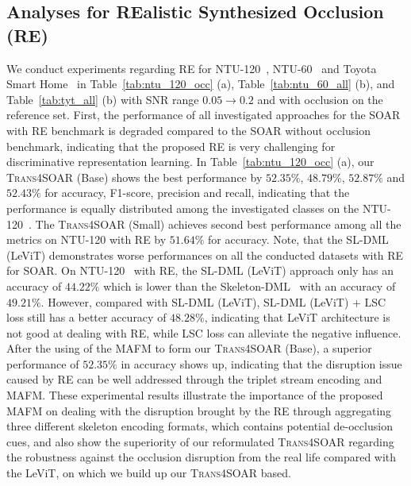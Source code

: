 \documentclass[lettersize,journal]{IEEEtran}
\begin{document}
\subsection{Analyses for REalistic Synthesized Occlusion (RE)}
We conduct experiments regarding RE for NTU-120~\cite{liu2019ntu}, NTU-60~\cite{shahroudy2016ntu} and Toyota Smart Home~\cite{Das_2019_ICCV} in Table~\ref{tab:ntu_120_occ} (a), Table~\ref{tab:ntu_60_all} (b), and Table~\ref{tab:tyt_all} (b) with SNR range $0.05\rightarrow0.2$ and with occlusion on the reference set.
First, the performance of all investigated approaches for the SOAR with RE benchmark is degraded compared to the SOAR without occlusion benchmark, indicating that the proposed RE is very challenging for discriminative representation learning.
In Table~\ref{tab:ntu_120_occ} (a), our \textsc{Trans4SOAR} (Base) shows the best performance by $52.35\%$, $48.79\%$, $52.87\%$ and $52.43\%$ for accuracy, F1-score, precision and recall, indicating that the performance is equally distributed among the investigated classes on the NTU-120~\cite{liu2019ntu}.
The \textsc{Trans4SOAR} (Small) achieves second best performance among all the metrics on NTU-120 with RE by $51.64\%$ for accuracy. Note, that the SL-DML (LeViT) demonstrates worse performances on all the conducted datasets with RE for SOAR. On NTU-120~\cite{liu2019ntu} with RE, the SL-DML (LeViT) approach only has an accuracy of $44.22\%$ which is lower than the Skeleton-DML~\cite{memmesheimer2020skeleton_dml} with an accuracy of $49.21\%$. However, compared with SL-DML (LeViT), SL-DML (LeViT) + LSC loss still has a better accuracy of $48.28\%$, indicating that LeViT architecture is not good at dealing with RE, while LSC loss can alleviate the negative influence.
After the using of the MAFM to form our \textsc{Trans4SOAR} (Base), a superior performance of $52.35\%$ in accuracy shows up, indicating that the disruption issue caused by RE can be well addressed through the triplet stream encoding and MAFM.
These experimental results illustrate the importance of the proposed MAFM on dealing with the disruption brought by the RE through aggregating three different skeleton encoding formats, which contains potential de-occlusion cues, and also show the superiority of our reformulated \textsc{Trans4SOAR} regarding the robustness against the occlusion disruption from the real life compared with the LeViT, on which we build up our \textsc{Trans4SOAR} based.
\end{document}
